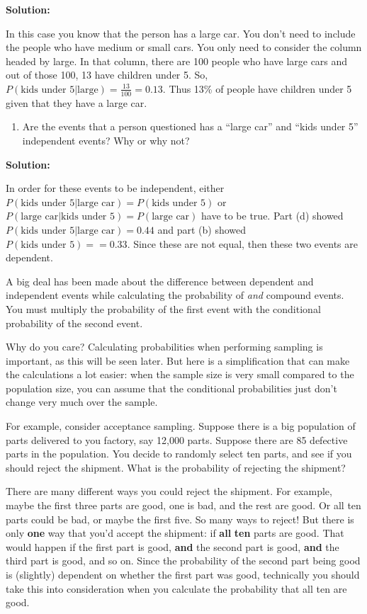 \documentclass[]{book}
\providecommand{\tightlist}{%
  \setlength{\itemsep}{0pt}\setlength{\parskip}{0pt}}
\begin{document}
\textbf{Solution:}

In this case you know that the person has a large car. You don't need to include the people who have medium or small cars. You only need to consider the column headed by large. In that column, there
are 100 people who have large cars and out of those 100, 13 have children under 5. So, \(P(\text{kids under 5|large})=\frac{13}{100}=0.13\). Thus 13\% of people have children under 5 given that they have a large car.

\begin{enumerate}
\def\labelenumi{\roman{enumi}.}
\tightlist
\item
  Are the events that a person questioned has a ``large car'' and ``kids under 5'' independent events? Why or why not?
\end{enumerate}

\textbf{Solution:}

In order for these events to be independent, either \(P(\text{kids under 5|large car})=P(\text{kids under 5})\) or \(P(\text{large car|kids under 5})=P(\text{large car})\) have to be true. Part (d) showed \(P(\text{kids under 5|large car})=0.44\) and part (b) showed \(P(\text{kids under 5})==0.33\). Since these are not equal, then these two events are dependent.

A big deal has been made about the difference between dependent and
independent events while calculating the probability of \emph{and} compound
events. You must multiply the probability of the first event with the
conditional probability of the second event.

Why do you care? Calculating probabilities when performing sampling is important, as this will be seen later. But here is a simplification that can make the calculations a lot easier: when the sample size is very small compared to the population size, you can
assume that the conditional probabilities just don't change very much over the sample.

For example, consider acceptance sampling. Suppose there is a big population of parts delivered to you factory, say 12,000 parts. Suppose there are 85 defective parts in the population. You decide to randomly select ten parts, and see if you should reject the shipment. What is the probability of rejecting the shipment?

There are many different ways you could reject the shipment. For example, maybe the first three parts are good, one is bad, and the rest are good. Or all ten parts could be bad, or maybe the first five. So many ways to reject! But there is only \textbf{one} way that you'd accept the shipment: if \textbf{all} \textbf{ten} parts are good. That would happen if the first part is good, \textbf{and} the second part is good, \textbf{and} the third part is good, and so on. Since the probability of the second part being good is (slightly) dependent on whether the first part was good, technically you should take this into consideration when you calculate the probability that all ten are good.
\end{document}
